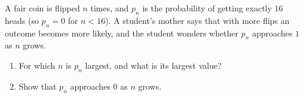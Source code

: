 A fair coin is flipped $n$ times, and $p_n$ is the probability of getting exactly $16$ heads (so $p_n=0$ for $n<16$). A student's mother says that with more flips an outcome becomes more likely, and the student wonders whether $p_n$ approaches $1$ as $n$ grows.
\begin{enumerate}
\item[(a)] For which $n$ is $p_n$ largest, and what is its largest value?
\item[(b)] Show that $p_n$ approaches $0$ as $n$ grows.
\end{enumerate}

